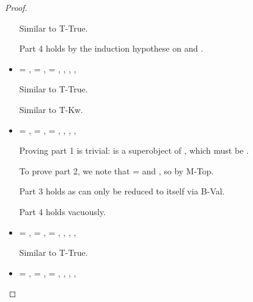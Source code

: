 \begin{lemma}
\begin{proof}
\begin{case}[B-Val]
\begin{itemize}
\begin{subcase}[T-HMap]
        Similar to T-True.

        Part 4 holds by the induction hypothese on {} and {}.
      \end{subcase}
    \item[]
      \begin{subcase}[T-Kw] \val{} = {\kw{}},
  \ep{} = {\kw{}},
  \e{} = {\kw{}},
  \issubtypein{}{\Value{\kw{}}}{\ty{}},
  \inpropenv{\topprop{}}{\thenprop{\prop{}}},
  \inpropenv{\botprop{}}{\elseprop{\prop{}}},
  \issubtypein{}{\emptyobject{}}{\object{}}

        Similar to T-True.
      \end{subcase}
      \begin{subcase}[T-Str]
        Similar to T-Kw.
      \end{subcase}
  \item[] 
    \begin{subcase}[T-False]
      \val{} = \false{},
\ep{} = \false, 
\e{} = \false, 
\issubtypein{}{\False}{\ty{}},
\inpropenv{\botprop{}}{\thenprop{\prop{}}},
\inpropenv{\topprop{}}{\elseprop{\prop{}}},
\issubtypein{}{\emptyobject{}}{\object{}}

Proving part 1 is trivial: \object{} is a superobject of \emptyobject{}, which must be \emptyobject{}. 

To prove part 2, we note that \val{} = \false{}
and \inpropenv{\topprop{}}{\elseprop{\prop{}}}, so \satisfies{\openv{}}{\elseprop{\prop{}}} by M-Top. 

Part 3 holds as \e{} can only be reduced to itself via B-Val.

Part 4 holds vacuously.
\end{subcase}
    \item[]
      \begin{subcase}[T-Class] \val{} = {\class{}},
  \ep{} = {\class{}},
  \e{} = {\class{}},
  \issubtypein{}{\Value{\class{}}}{\ty{}},
  \inpropenv{\topprop{}}{\thenprop{\prop{}}},
  \inpropenv{\botprop{}}{\elseprop{\prop{}}},
  \issubtypein{}{\emptyobject{}}{\object{}}

        Similar to T-True.
      \end{subcase}
    \item[]
      \begin{subcase}[T-Instance]
        \val{} = {\classvalue{\classhint{}} {}},
        \ep{} = {\classvalue{\classhint{}} {\overrightarrow {\classfieldpair{\fld{}} {\val{}}}}},
        \e{} = {\classvalue{\classhint{}} {\overrightarrow {\classfieldpair{\fld{}} {\val{}}}}},
        \issubtypein{}{\class{}}{\ty{}},
        \inpropenv{\topprop{}}{\thenprop{\prop{}}},
        \inpropenv{\botprop{}}{\elseprop{\prop{}}},
        \issubtypein{}{\emptyobject{}}{\object{}}



\end{subcase}
\end{itemize}
\end{case}
\end{proof}
\end{lemma}
